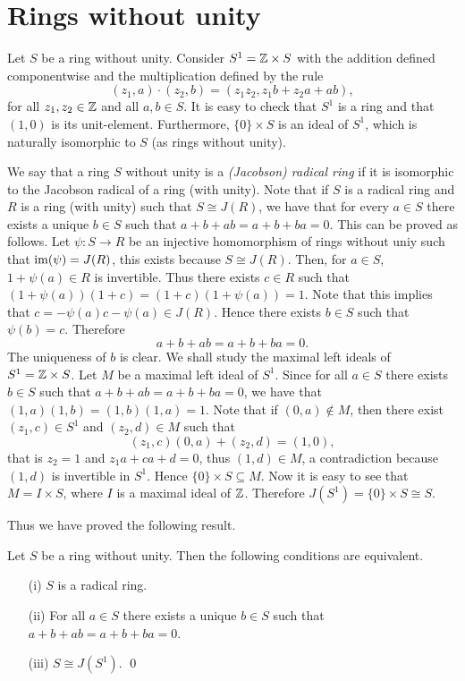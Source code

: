 \section*{Rings without unity}

Let $S$ be a ring without unity. Consider $S^1=\mathbb{Z}\times S$ with the addition defined componentwise and the multiplication defined by
the rule
$$(z_1,a)\cdot (z_2,b)=(z_1z_2,z_1b+z_2a+ab),
$$
for all $z_1,z_2\in\mathbb{Z}$ and all $a,b\in S$. It is easy to check that $S^1$ is a ring and that $(1,0)$ is its unit-element. Furthermore, 
$\{0\}\times S$ is an ideal of $S^1$, which is naturally isomorphic to $S$ (as rings without unity).

We say that a ring $S$ without unity is a {\em (Jacobson) radical ring} if it is isomorphic to the Jacobson radical of a ring (with unity). Note that if $S$ is a radical ring and $R$ is a ring (with unity) such that $S\cong J(R)$, we have that for every $a\in S$ there exists a unique $b\in S$ such that $a+b+ab=a+b+ba=0$. This can be proved as follows. Let $\psi\colon S\rightarrow R$ be an injective homomorphism of rings without uniy such that $\operatorname{im}(\psi)=J(R)$, this exists because $S\cong J(R)$. Then, for $a\in S$,
$1+\psi(a)\in R$ is invertible. Thus there exists $c\in R$ such that $(1+\psi(a))(1+c)=(1+c)(1+\psi(a))=1$. Note that this implies that
$c=-\psi(a)c-\psi(a)\in J(R)$. Hence there exists $b\in S$ such that $\psi(b)=c$. Therefore 
$$a+b+ab=a+b+ba=0.$$ 
The uniqueness of $b$ is clear. 
We shall study the  maximal left ideals of $S^1=\mathbb{Z}\times S$. Let $M$ be a maximal left ideal of $S^1$. Since for all $a\in S$ there exists $b\in S$ such that $a+b+ab=a+b+ba=0$, we have that $(1,a)(1,b)=(1,b)(1,a)=1$.
Note that if $(0,a)\notin M$, then there exist $(z_1,c)\in S^1$ and $(z_2,d)\in M$ such that
$$(z_1,c)(0,a)+(z_2,d)=(1,0),$$
that is $z_2=1$ and $z_1a+ca+d=0$, thus $(1,d)\in M$, a contradiction because $(1,d)$ is invertible in $S^1$. Hence $\{0\}\times S\subseteq M$. Now it is easy to see that $M=I\times S$, where $I$ is a maximal ideal of $\mathbb{Z}$. Therefore
$J(S^1)=\{0\}\times S\cong S$. 

Thus we have proved the following result.
\begin{proposition}\label{Prop5.1}
	Let $S$ be a ring without unity. Then the following conditions are equivalent.
	\begin{itemize}
		\item[(i)] $S$ is a radical ring.
		\item[(ii)] For all $a\in S$ there exists a unique $b\in S$ such that $a+b+ab=a+b+ba=0$.
		\item[(iii)] $S\cong J(S^1)$. \qed 
	\end{itemize}
	\end{proposition}  

